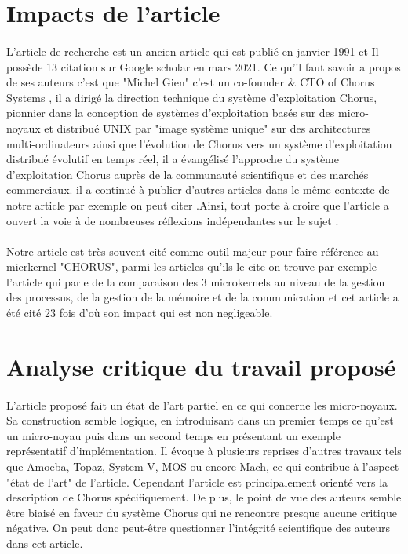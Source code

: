\documentclass[a4paper, 12pt]{article}
\begin{document}
\clearpage 
\section{Impacts de l'article}
\paragraph{}
L’article de recherche est un  ancien article qui est publié en janvier 1991 et Il possède 13 citation sur Google scholar en mars
2021.
\newline 
Ce qu'il faut savoir a propos de ses auteurs c'est que "Michel Gien" c'est un co-founder & CTO of Chorus Systems , il a dirigé la direction technique du système d'exploitation Chorus, pionnier dans la conception de systèmes d'exploitation basés sur des micro-noyaux et distribué UNIX par "image système unique" sur des architectures multi-ordinateurs ainsi que l'évolution de Chorus vers un système d'exploitation distribué évolutif en temps réel, il a évangélisé l'approche du système d'exploitation Chorus auprès de la communauté scientifique et des marchés commerciaux. il a continué à publier d'autres articles dans le même contexte de notre article par exemple on peut citer \cite{n1}.Ainsi, tout porte à croire que l'article a ouvert la voie à de nombreuses réflexions indépendantes sur le sujet . 
\paragraph{}
Notre article est très souvent cité comme outil majeur pour faire référence au micrkernel "CHORUS", parmi les articles qu'ils le cite on trouve par exemple \cite{n2} l'article qui parle de la comparaison des 3 microkernels au niveau de la gestion des processus, de la gestion de la mémoire et de la communication et cet article a été cité 23 fois d'où son impact qui est non negligeable.


 
\section{Analyse critique du travail proposé}
\paragraph{}
L'article proposé fait un état de l'art partiel en ce qui concerne les micro-noyaux. Sa construction semble logique, en introduisant dans un premier temps ce qu'est un micro-noyau puis dans un second temps en présentant un exemple représentatif d'implémentation. Il évoque à plusieurs reprises d'autres travaux tels que Amoeba, Topaz, System-V, MOS ou encore  Mach, ce qui contribue à l'aspect "état de l'art" de l'article. Cependant l'article est principalement orienté vers la description de Chorus spécifiquement. De plus, le point de vue des auteurs semble être biaisé en faveur du système Chorus qui ne rencontre presque aucune critique négative. On peut donc peut-être questionner l'intégrité scientifique des auteurs dans cet article.
\end{document}
